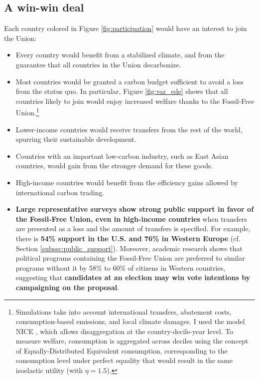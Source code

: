 \documentclass[12pt,english]{article}
\begin{document}
\subsection{A win-win deal\label{subsec:winwin}}

Each country colored in Figure \ref{fig:participation} would have an interest to join the Union: 
\begin{itemize}
  \item Every country would benefit from a stabilized climate, and from the guarantee that all countries in the Union decarbonize.
  \item Most countries would be granted a carbon budget sufficient to avoid a loss from the status quo. In particular, Figure \ref{fig:var_ede} shows that all countries likely to join would enjoy increased welfare thanks to the Fossil-Free Union.\footnote{\label{ede}Simulations take into account international transfers, abatement costs, consumption-based emissions, and local climate damages. I used the model NICE \citep{young-brun_within-country_2025}, which allows disaggregation at the country-decile-year level. To measure welfare, consumption is aggregated across deciles using the concept of Equally-Distributed Equivalent consumption, corresponding to the consumption level under perfect equality that would result in the same  isoelastic utility (with $\eta=1.5$).} %
  \item Lower-income countries would receive transfers from the rest of the world, spurring their sustainable development.
  \item Countries with an important low-carbon industry, such as East Asian countries, would gain from the stronger demand for these goods.
  \item High-income countries would benefit from the efficiency gains allowed by international carbon trading.
  \item \textbf{Large representative surveys show strong public support in favor of the Fossil-Free Union, even in high-income countries} when transfers are presented as a loss and the amount of transfers is specified. For example, there is\textbf{ 54\% support in the U.S. and 76\% in Western Europe} (cf. Section \ref{subsec:public_support}).\cite{fabre_majority_2025} 
  Moreover, academic research shows that political programs containing the Fossil-Free Union are preferred to similar programs without it by 58\% to 60\% of citizens in Western countries, suggesting that \textbf{candidates at an election may win vote intentions by campaigning on the proposal}.\cite{fabre_majority_2025}
\end{itemize}
\end{document}
